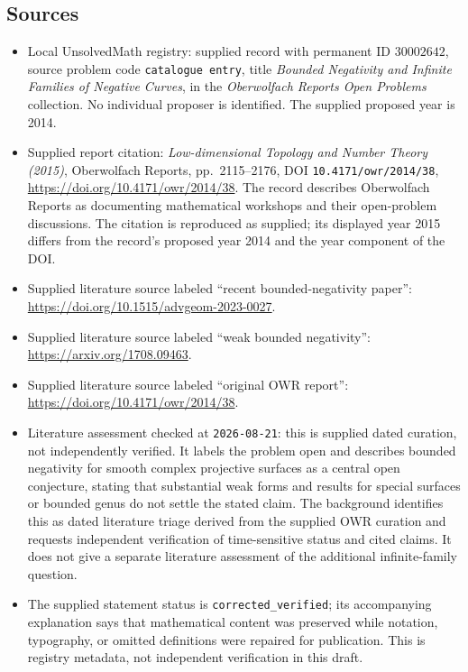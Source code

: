 \documentclass[11pt]{article}
\begin{document}
\subsection{Sources}
\begin{itemize}
\item Local UnsolvedMath registry: supplied record with permanent ID \(30002642\), source problem code \texttt{catalogue entry}, title \emph{Bounded Negativity and Infinite Families of Negative Curves}, in the \emph{Oberwolfach Reports Open Problems} collection. No individual proposer is identified. The supplied proposed year is 2014.
\item Supplied report citation: \emph{Low-dimensional Topology and Number Theory (2015)}, Oberwolfach Reports, pp.~2115--2176, DOI \texttt{10.4171/owr/2014/38}, \url{https://doi.org/10.4171/owr/2014/38}. The record describes Oberwolfach Reports as documenting mathematical workshops and their open-problem discussions. The citation is reproduced as supplied; its displayed year 2015 differs from the record's proposed year 2014 and the year component of the DOI.
\item Supplied literature source labeled ``recent bounded-negativity paper'': \url{https://doi.org/10.1515/advgeom-2023-0027}.
\item Supplied literature source labeled ``weak bounded negativity'': \url{https://arxiv.org/1708.09463}.
\item Supplied literature source labeled ``original OWR report'': \url{https://doi.org/10.4171/owr/2014/38}.
\item Literature assessment checked at \texttt{2026-08-21}: this is supplied dated curation, not independently verified. It labels the problem open and describes bounded negativity for smooth complex projective surfaces as a central open conjecture, stating that substantial weak forms and results for special surfaces or bounded genus do not settle the stated claim. The background identifies this as dated literature triage derived from the supplied OWR curation and requests independent verification of time-sensitive status and cited claims. It does not give a separate literature assessment of the additional infinite-family question.
\item The supplied statement status is \texttt{corrected\_verified}; its accompanying explanation says that mathematical content was preserved while notation, typography, or omitted definitions were repaired for publication. This is registry metadata, not independent verification in this draft.
\end{itemize}
\end{document}

